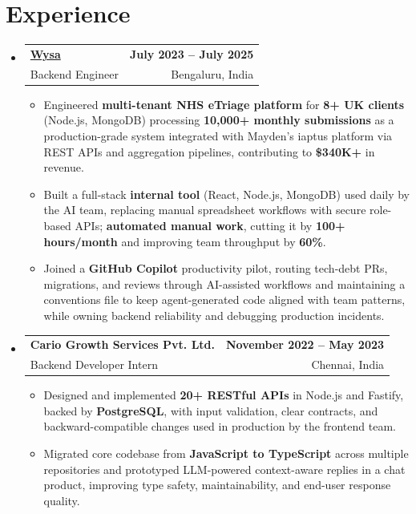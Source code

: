 \documentclass[letterpaper,10pt]{article}
\makeatletter
\newcommand{\resumeItem}[1]{
  \item\small{#1\vspace{-1pt}}
}
\newcommand{\resumeSubheading}[4]{
  \vspace{1pt}\item
    \begin{tabular*}{0.985\textwidth}[t]{l@{\extracolsep{\fill}}r}
      \textbf{#1} & \textbf{\small #2} \\
      {\small\color{ResumeSlate} #3} & {\small\color{ResumeSlate} #4} \\
    \end{tabular*}\vspace{-6pt}
}
\newcommand{\resumeSubHeadingListStart}{\begin{itemize}[leftmargin=0.0in, label={}, itemsep=2pt, topsep=2pt]}
\newcommand{\resumeSubHeadingListEnd}{\end{itemize}}
\newcommand{\resumeItemListStart}{\begin{itemize}[leftmargin=0.18in, itemsep=2pt, topsep=1pt]}
\newcommand{\resumeItemListEnd}{\end{itemize}\vspace{-4pt}}
\makeatother
\begin{document}
\section{Experience}
\resumeSubHeadingListStart
  \resumeSubheading
    {\href{https://www.wysa.io}{Wysa}}{July 2023 -- July 2025}
    {Backend Engineer}{Bengaluru, India}
    \resumeItemListStart
      \resumeItem{Engineered \textbf{multi-tenant NHS eTriage platform} for \textbf{8+ UK clients} (Node.js, MongoDB) processing \textbf{10{,}000+ monthly submissions} as a production-grade system integrated with Mayden's iaptus platform via REST APIs and aggregation pipelines, contributing to \textbf{\$340K+} in revenue.}
      \resumeItem{Built a full-stack \textbf{internal tool} (React, Node.js, MongoDB) used daily by the AI team, replacing manual spreadsheet workflows with secure role-based APIs; \textbf{automated manual work}, cutting it by \textbf{100+ hours/month} and improving team throughput by \textbf{60\%}.}
      \resumeItem{Joined a \textbf{GitHub Copilot} productivity pilot, routing tech-debt PRs, migrations, and reviews through AI-assisted workflows and maintaining a conventions file to keep agent-generated code aligned with team patterns, while owning backend reliability and debugging production incidents.}
    \resumeItemListEnd
  \resumeSubheading
    {Cario Growth Services Pvt. Ltd.}{November 2022 -- May 2023}
    {Backend Developer Intern}{Chennai, India}
    \resumeItemListStart
      \resumeItem{Designed and implemented \textbf{20+ RESTful APIs} in Node.js and Fastify, backed by \textbf{PostgreSQL}, with input validation, clear contracts, and backward-compatible changes used in production by the frontend team.}
      \resumeItem{Migrated core codebase from \textbf{JavaScript to TypeScript} across multiple repositories and prototyped LLM-powered context-aware replies in a chat product, improving type safety, maintainability, and end-user response quality.}
    \resumeItemListEnd
\resumeSubHeadingListEnd
\vspace{-4pt}
\end{document}
